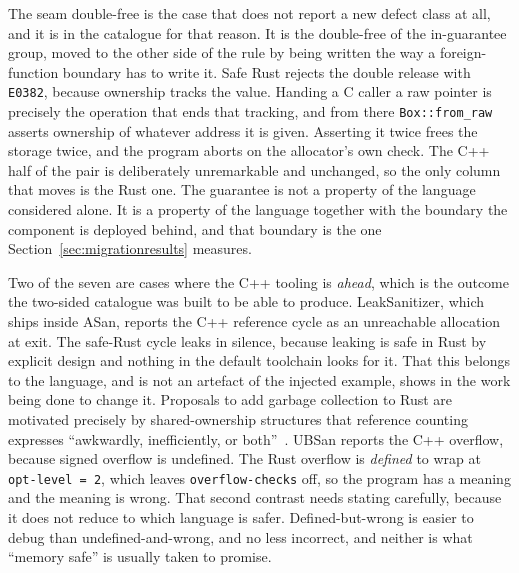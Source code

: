 \documentclass[english,oneside,a4paper,censored,csm,software-track-2020]{HYthesisML}
\begin{document}
The seam double-free is the case that does not report a new defect class at all, and it is in
the catalogue for that reason. It is the double-free of the in-guarantee group, moved to the
other side of the rule by being written the way a foreign-function boundary has to write it.
Safe Rust rejects the double release with \texttt{E0382}, because ownership tracks the value.
Handing a C caller a raw pointer is precisely the operation that ends that tracking, and from
there \texttt{Box::from\_raw} asserts ownership of whatever address it is given. Asserting it
twice frees the storage twice, and the program aborts on the allocator's own check. The C++ half
of the pair is deliberately unremarkable and unchanged, so the only column that moves is the
Rust one. The guarantee is not a property of the language considered alone. It is a property of
the language together with the boundary the component is deployed behind, and that boundary is
the one Section~\ref{sec:migrationresults} measures.

Two of the seven are cases where the C++ tooling is \emph{ahead}, which is the outcome the
two-sided catalogue was built to be able to produce. LeakSanitizer, which ships inside ASan,
reports the C++ reference cycle as an unreachable allocation at exit. The safe-Rust cycle leaks
in silence, because leaking is safe in Rust by explicit design and nothing in the default
toolchain looks for it. That this belongs to the language, and is not an artefact of the
injected example, shows in the work being done to change it. Proposals to add garbage
collection to Rust are motivated precisely by shared-ownership structures that reference counting
expresses ``awkwardly, inefficiently, or both''~\cite{hughes2025gcrust}. UBSan reports the C++ overflow, because signed overflow is undefined.
The Rust overflow is \emph{defined} to wrap at \texttt{opt-level~=~2}, which leaves
\texttt{overflow-checks} off, so the program has a meaning and the meaning is wrong. That
second contrast needs stating carefully, because it does not reduce to which language is
safer. Defined-but-wrong is easier to debug than undefined-and-wrong, and no less incorrect, and
neither is what ``memory safe'' is usually taken to promise.
\end{document}

